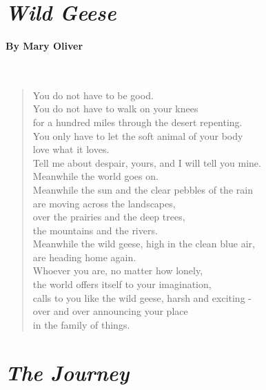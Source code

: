 \documentclass[12pt, openany, letterpaper]{memoir}
\begin{document}
\newpage
\section*{\emph{Wild Geese}}
\paragraph{By Mary Oliver}~
\begin{verse}
	You do not have to be good.\\
	You do not have to walk on your knees\\
	for a hundred miles through the desert repenting.\\
	You only have to let the soft animal of your body\\
	love what it loves.\\
	Tell me about despair, yours, and I will tell you mine.\\
	Meanwhile the world goes on.\\
	Meanwhile the sun and the clear pebbles of the rain\\
	are moving across the landscapes,\\
	over the prairies and the deep trees,\\
	the mountains and the rivers.\\
	Meanwhile the wild geese, high in the clean blue air,\\
	are heading home again.\\
	Whoever you are, no matter how lonely,\\
	the world offers itself to your imagination,\\
	calls to you like the wild geese, harsh and exciting -\\
	over and over announcing your place\\
	in the family of things.
\end{verse}

\newpage
\section*{\emph{The Journey}}
\end{document}
